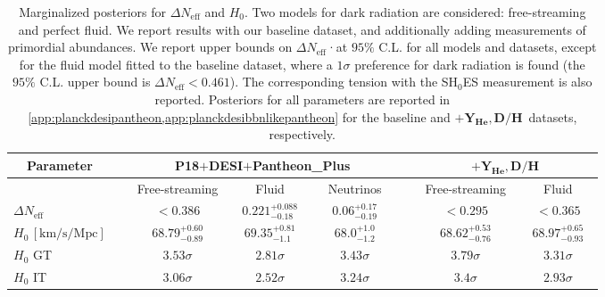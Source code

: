 \documentclass[aps,prd,twocolumn,notitlepage,
superscriptaddress,
nofootinbib,floatfix]{revtex4-2}
\newcommand{\planck}{\textbf{P18}}
\newcommand{\desi}{$\mathbf{+}$\textbf{DESI}}
\newcommand{\pantheon}{$\mathbf{+}${\bf Pantheon\_Plus}}
\newcommand{\bbnlike}{$\mathbf{+ Y_\text{He}, D/H}$}
\newcommand{\DNeff}{\Delta N_\text{eff}}
\begin{document}
\begin{table}
\begin{tabular} {| l |l| c| c|c|l| c| c|}
\hline\hline
 \multicolumn{1}{|c|}{ Parameter}& &  \multicolumn{3}{|c|}{\planck\desi\pantheon} &&  \multicolumn{2}{|c|}{\bbnlike}\\
 \hline
  \multicolumn{1}{|c|}{}& & \multicolumn{1}{|c|}{~Free-streaming~} &  \multicolumn{1}{|c|}{~~~Fluid~~~} & \multicolumn{1}{|c|}{~~Neutrinos~~} & &\multicolumn{1}{|c|}{~Free-streaming~} &  \multicolumn{1}{|c|}{~~~Fluid~~~}
  \\
\hline\hline
$\Delta N_{\mbox{eff}}$  &  & $ < 0.386$  & $0.221^{+0.088}_{-0.18}    $ & $0.06^{+0.17}_{-0.19}      $& &$< 0.295$  & $ < 0.365$
\\
\hline
$H_0 \,[\mathrm{km}/\mathrm{s}/\mathrm{Mpc}]$ & &$68.79^{+0.60}_{-0.89}     $ & $69.35^{+0.81}_{-1.1}      $ & $68.0^{+1.0}_{-1.2}      $ && $68.62^{+0.53}_{-0.76}     $ & $68.97^{+0.65}_{-0.93}     $
\\
\hline\hline
$H_0$ GT & &$3.53\sigma $ & $2.81\sigma $ & $3.43\sigma $& & $3.79\sigma $ & $3.31\sigma $
\\
\hline
$H_0$ IT & &$3.06\sigma $ & $2.52\sigma $ &$3.24\sigma $& &$3.4\sigma $ & $2.93\sigma $
\\
\hline
\end{tabular}
\caption{Marginalized posteriors for $\Delta N_\text{eff}$ and $H_0$. Two models for dark radiation are considered: free-streaming and perfect fluid. We report results with our baseline dataset, and additionally adding measurements of primordial abundances. We report upper bounds on $\Delta N_\text{eff}$·at $95\%$ C.L. for all models and datasets, except for the fluid model fitted to the baseline dataset, where a $1\sigma$ preference for dark radiation is found (the $95\%$ C.L. upper bound is $\DNeff < 0.461$). The corresponding tension with the SH$_0$ES measurement is also reported. Posteriors for all parameters are reported in \cref{app:planckdesipantheon,app:planckdesibbnlikepantheon} for the baseline and \bbnlike \, datasets, respectively.}
\label{tab:constraints}
\end{table}
\end{document}
